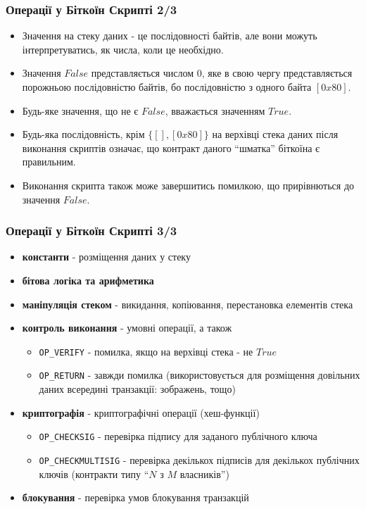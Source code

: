\documentclass{beamer}
\begin{document}
\begin{frame}[fragile]
  \frametitle{Операції у Біткоїн Скрипті 2/3}
  \begin{itemize}
  \item Значення на стеку даних - це послідовності байтів, але вони можуть
    інтерпретуватись, як числа, коли це необхідно.
  \item Значення $False$ представляється числом 0, яке в свою чергу
    представляється порожньою послідовністю байтів, бо послідовністю з одного
    байта $[0x80]$.
  \item Будь-яке значення, що не є $False$, вважається значенням $True$.
  \item Будь-яка послідовність, крім $\{[], [0x80]\}$ на верхівці стека даних
    після виконання скриптів означає, що контракт даного ``шматка'' біткоїна є
    правильним.
  \item Виконання скрипта також може завершитись помилкою, що прирівнються до
    значення $False$.
  \end{itemize}
\end{frame}

\begin{frame}[fragile]
  \frametitle{Операції у Біткоїн Скрипті 3/3}
  \begin{itemize}
  \item \textbf{константи} - розміщення даних у стеку
  \item \textbf{бітова логіка та арифметика}
  \item \textbf{маніпуляція стеком} - викидання, копіювання, перестановка
    елементів стека
  \item \textbf{контроль виконання} - умовні операції, а також
    \begin{itemize}
    \item \texttt{OP_VERIFY} - помилка, якщо на верхівці стека -
      не $True$
    \item \texttt{OP_RETURN} - завжди помилка (використовується
      для розміщення довільних даних всередині транзакції: зображень, тощо)
    \end{itemize}
  \item \textbf{криптографія} - криптографічні операції (хеш-функції)
    \begin{itemize}
    \item \texttt{OP_CHECKSIG} - перевірка підпису для заданого
      публічного ключа
    \item \texttt{OP_CHECKMULTISIG} - перевірка декількох підписів
      для декількох публічних ключів (контракти типу ``$N$ з $M$ власників'')
    \end{itemize}
  \item \textbf{блокування} - перевірка умов блокування транзакцій
  \end{itemize}
\end{frame}
\end{document}
